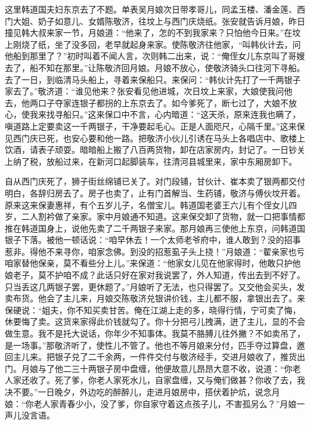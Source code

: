 这里韩道国夫妇东京去了不题。单表吴月娘次日带孝哥儿，同孟玉楼、潘金莲、西门大姐、奶子如意儿、女婿陈敬济，往坟上与西门庆烧纸。张安就告诉月娘，昨日撞见韩大叔来家一节，月娘道：“他来了，怎的不到我家来？只怕他今日来。”在坟上刚烧了纸，坐了没多回，老早就起身来家。使陈敬济往他家，“叫韩伙计去，问他船到那里了？”初时叫着不闻人言，次则韩二出来，说：“俺侄女儿东京叫了哥嫂去了，船不知在那里。”让陈敬济回月娘。月娘不放心，使敬济骑头口往河下寻船。去了一日，到临清马头船上，寻着来保船只。来保问：“韩伙计先打了一千两银子家去了。”敬济道：“谁见他来？张安看见他进城，次日坟上来家，大娘使我问他去，他两口子夺家连银子都拐的上东京去了。如今爹死了，断七过了，大娘不放心，使我来找寻船只。”这来保口中不言，心内暗道：“这天杀，原来连我也瞒了，嗔道路上定要卖这一千两银子，干净要起毛心。正是人面咫尺，心隔千里。”这来保见西门庆已死，也安心要和他一路。把敬济小伙儿引诱在马头上各唱店中、歌楼上饮酒，请表子顽耍。暗暗船上搬了八百两货物，卸在店家房内，封记了。一日钞关上纳了税，放船过来，在新河口起脚装车，往清河县城里来，家中东厢房卸下。

自从西门庆死了，狮子街丝绵铺已关了。对门段铺，甘伙计、崔本卖了银两都交付明白，各辞归房去了。房子也卖了，止有门首解当、生药铺，敬济与傅伙坟开着。原来这来保妻惠祥，有个五岁儿子，名僧宝儿。韩道国老婆王六儿有个侄女儿四岁，二人割衿做了亲家。家中月娘通不知道。这来保交卸了货物，就一口把事情都推在韩道国身上，说他先卖了二千两银子来家。那月娘再三使他上东京，问韩道国银子下落。被他一顿话说：“咱早休去！一个太师老爷府中，谁人敢到？没的招事惹非。得他不来寻你，咱家念佛。到没的招惹虱子头上挠！”月娘道：“翟亲家也亏咱家替他保亲，莫不看些分上儿。”来保道：“他家女儿见在他家得时，他敢只护他娘老子，莫不护咱不成？此话只好在家对我说罢了，外人知道，传出去到不好了。只当丢这几两银子罢，更休题了。”月娘听了无法，也只得罢了。又交他会买头，发卖布货。他会了主儿来，月娘交陈敬济兑银讲价钱，主儿都不服，拿银出去了。来保硬说：“姐夫，你不知买卖甘苦。俺在江湖上走的多，晓得行情，宁可卖了悔，休要悔了卖。这货来家得此价钱就勾了。你十分把弓儿拽满，迸了主儿，显的不会做生意。我不是托大说话，你年少不知事体。我莫不胳膊儿往外撇？不如卖吊了，是一场事。”那敬济听了，使性儿不管了。他也不等月娘来分付，匹手夺过算盘，邀回主儿来。把银子兑了二千余两，一件件交付与敬济经手，交进月娘收了，推货出门。月娘与了他二三十两银子房中盘缠，他便故意儿昂昂大意不收，说道：“你老人家还收了。死了爹，你老人家死水儿，自家盘缠，又与俺们做甚？你收了去，我决不要。”一日晚夕，外边吃的醉醉儿，走进月娘房中，搭伏着护炕，说念月娘：“你老人家青春少小，没了爹，你自家守着这点孩子儿，不害孤另么？”月娘一声儿没言语。

